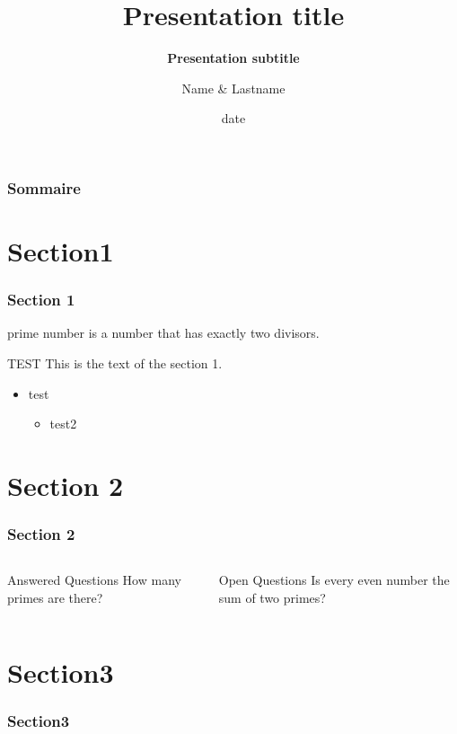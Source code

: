 \documentclass[xcolor=svgnames, 8pt, sans, handout]{beamer}%
\title{Presentation title}%
\subtitle{\textbf{Presentation subtitle}}%
\author{Name \& Lastname}%
\institute{Insitut name}%
\date{date}
\begin{document}
\begin{frame}
	\titlepage %
\end{frame}

\begin{frame}
	\frametitle{Sommaire}
	\tableofcontents[pausesections]
\end{frame}

\section{Section1}
\begin{frame}
\frametitle{Section 1}
\alert{prime number} is a number that has exactly two divisors.
\begin{block}{TEST}
This is the text of the section 1.
\end{block}
\begin{itemize}
\item test
\begin{itemize}
\item test2
\end{itemize}
\end{itemize}
\end{frame}

\section{Section 2}
\begin{frame}
\frametitle{Section 2}
\begin{columns}[t]%
      \begin{block}{Answered Questions}
        How many primes are there?
      \end{block}
      \begin{block}{Open Questions}
       Is every even number the sum of two primes?
      \end{block}
  \end{columns}
\end{frame}


\section{Section3}
\begin{frame}
\frametitle{Section3}

\end{frame}
\end{document}
